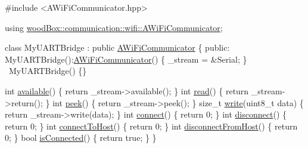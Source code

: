 \begin{DoxyCode}
\textcolor{preprocessor}{#include <AWiFiCommunicator.hpp>}

\textcolor{keyword}{using} \mbox{\hyperlink{classwood_box_1_1communication_1_1wifi_1_1_a_wi_fi_communicator}{woodBox::communication::wifi::AWiFiCommunicator}};

\textcolor{keyword}{class }MyUARTBridge : \textcolor{keyword}{public} \mbox{\hyperlink{classwood_box_1_1communication_1_1wifi_1_1_a_wi_fi_communicator_a9d1dc13ca9243170b04211bef2b86ed2}{AWiFiCommunicator}} \{
  \textcolor{keyword}{public}:
    MyUARTBridge():\mbox{\hyperlink{classwood_box_1_1communication_1_1wifi_1_1_a_wi_fi_communicator_a9d1dc13ca9243170b04211bef2b86ed2}{AWiFiCommunicator}}() \{
      \_stream = &Serial;
    \}
    ~MyUARTBridge() \{\}

    \textcolor{keywordtype}{int} \mbox{\hyperlink{classwood_box_1_1communication_1_1wifi_1_1_a_wi_fi_communicator_a541a26bf14cf77c13cc960963944ba1d}{available}}() \{ \textcolor{keywordflow}{return} \_stream->available(); \}
    \textcolor{keywordtype}{int} \mbox{\hyperlink{classwood_box_1_1communication_1_1wifi_1_1_a_wi_fi_communicator_af4bc1adc96c124e769eb8c54d76476cf}{read}}() \{ \textcolor{keywordflow}{return} \_stream->return(); \}
    \textcolor{keywordtype}{int} \mbox{\hyperlink{classwood_box_1_1communication_1_1wifi_1_1_a_wi_fi_communicator_ae0a1f2f1906f76a12dd5f9b7c10b1282}{peek}}() \{ \textcolor{keywordflow}{return} \_stream->peek(); \}
    \textcolor{keywordtype}{size\_t} \mbox{\hyperlink{classwood_box_1_1communication_1_1wifi_1_1_a_wi_fi_communicator_a7c40345fe59737b83bfee33ecb7be013}{write}}(uint8\_t data) \{ \textcolor{keywordflow}{return} \_stream->write(data); \}
    \textcolor{keywordtype}{int} \mbox{\hyperlink{classwood_box_1_1communication_1_1wifi_1_1_a_wi_fi_communicator_a7c4763c1594a4b934e5a39e90b271799}{connect}}() \{ \textcolor{keywordflow}{return} 0; \}
    \textcolor{keywordtype}{int} \mbox{\hyperlink{classwood_box_1_1communication_1_1wifi_1_1_a_wi_fi_communicator_ae0be1e1dd1e0508bdd2f348f0052f6e6}{disconnect}}() \{ \textcolor{keywordflow}{return} 0; \}
    \textcolor{keywordtype}{int} \mbox{\hyperlink{classwood_box_1_1communication_1_1wifi_1_1_a_wi_fi_communicator_ad8c31be391a58bfabe21c5ef99a94719}{connectToHost}}() \{ \textcolor{keywordflow}{return} 0; \}
    \textcolor{keywordtype}{int} \mbox{\hyperlink{classwood_box_1_1communication_1_1wifi_1_1_a_wi_fi_communicator_aeb87d8a22ad08c929c28191a4c725a5b}{disconnectFromHost}}() \{ \textcolor{keywordflow}{return} 0; \}
    \textcolor{keywordtype}{bool} \mbox{\hyperlink{classwood_box_1_1communication_1_1wifi_1_1_a_wi_fi_communicator_afe42af0100dd483564995b8fc54b2e71}{isConnected}}() \{ \textcolor{keywordflow}{return} \textcolor{keyword}{true}; \}
\}
\end{DoxyCode}
 

